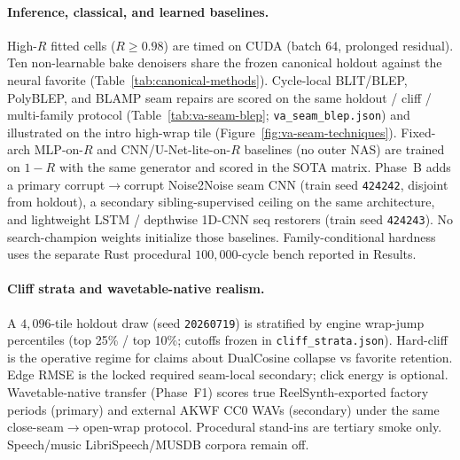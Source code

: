 \paragraph{Inference, classical, and learned baselines.}
High-$R$ fitted cells ($R\ge 0.98$) are timed on CUDA (batch 64, prolonged residual).
Ten non-learnable bake denoisers share the frozen canonical holdout against the neural favorite (Table~\ref{tab:canonical-methods}).
Cycle-local BLIT/BLEP, PolyBLEP, and BLAMP seam repairs are scored on the same holdout / cliff / multi-family protocol (Table~\ref{tab:va-seam-blep}; \texttt{va\_seam\_blep.json}) and illustrated on the intro high-wrap tile (Figure~\ref{fig:va-seam-techniques}).
Fixed-arch MLP-on-$R$ and CNN/U-Net-lite-on-$R$ baselines (no outer NAS) are trained on $1{-}R$ with the same generator and scored in the SOTA matrix.
Phase~B adds a primary corrupt$\to$corrupt Noise2Noise seam CNN (train seed \texttt{424242}, disjoint from holdout), a secondary sibling-supervised ceiling on the same architecture, and lightweight LSTM / depthwise 1D-CNN seq restorers (train seed \texttt{424243}).
No search-champion weights initialize those baselines.
Family-conditional hardness uses the separate Rust procedural $100{,}000$-cycle bench reported in Results.

\paragraph{Cliff strata and wavetable-native realism.}
A $4{,}096$-tile holdout draw (seed \texttt{20260719}) is stratified by engine wrap-jump percentiles (top 25\% / top 10\%; cutoffs frozen in \texttt{cliff\_strata.json}).
Hard-cliff is the operative regime for claims about DualCosine collapse vs favorite retention.
Edge RMSE is the locked required seam-local secondary; click energy is optional.
Wavetable-native transfer (Phase~F1) scores true ReelSynth-exported factory periods (primary) and external AKWF CC0 WAVs (secondary) under the same close-seam$\to$open-wrap protocol.
Procedural stand-ins are tertiary smoke only.
Speech/music LibriSpeech/MUSDB corpora remain off.


